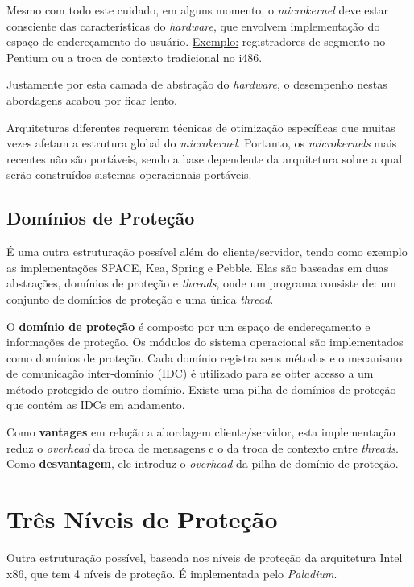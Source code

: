 Mesmo com todo este cuidado, em alguns momento, o \textit{microkernel} deve estar consciente das características do \textit{hardware}, que envolvem implementação do espaço de endereçamento do usuário. \underline{Exemplo:} registradores de segmento no Pentium ou a troca de contexto tradicional no i486.

Justamente por esta camada de abstração do \textit{hardware}, o desempenho nestas abordagens acabou por ficar lento.

Arquiteturas diferentes requerem técnicas de otimização específicas que muitas vezes afetam a estrutura global do \textit{microkernel}. Portanto, os \textit{microkernels} mais recentes não são portáveis, sendo a base dependente da arquitetura sobre a qual serão construídos sistemas operacionais portáveis.




\subsection{Domínios de Proteção}
É uma outra estruturação possível além do cliente/servidor, tendo como exemplo as implementações SPACE, Kea, Spring e Pebble. Elas são baseadas em duas abstrações, domínios de proteção e \textit{threads}, onde um programa consiste de: um conjunto de domínios de proteção e uma única \textit{thread}.

O \textbf{domínio de proteção} é composto por um espaço de endereçamento e informações de proteção. Os módulos do sistema operacional são implementados como domínios de proteção. Cada domínio registra seus métodos e o mecanismo de comunicação inter-domínio (IDC) é utilizado para se obter acesso a um método protegido de outro domínio. Existe uma pilha de domínios de proteção que contém as IDCs em andamento.

Como \textbf{vantages} em relação a abordagem cliente/servidor, esta implementação reduz o \textit{overhead} da troca de mensagens e o da troca de contexto entre \textit{threads}. Como \textbf{desvantagem}, ele introduz o \textit{overhead} da pilha de domínio de proteção.






\section{Três Níveis de Proteção}
Outra estruturação possível, baseada nos níveis de proteção da arquitetura Intel x86, que tem 4 níveis de proteção. É implementada pelo \textit{Paladium}.

